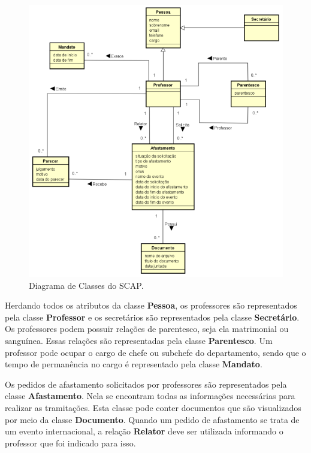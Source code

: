 \begin{figure}[h]
	\centering
	\includegraphics[scale=0.7]{figuras/fig-requisitos-diagrama-classes} 
	\caption{Diagrama de Classes do SCAP.}
	\label{fig-requisitos-diagrama-classes}
\end{figure}

Herdando todos os atributos da classe \textbf{Pessoa}, os professores são representados pela classe \textbf{Professor} e os secretários são representados pela classe \textbf{Secretário}. Os professores podem possuir relações de parentesco, seja ela matrimonial ou sanguínea. Essas relações são representadas pela classe \textbf{Parentesco}. Um professor pode ocupar o cargo de chefe ou subchefe do departamento, sendo que o tempo de permanência no cargo é representado pela classe \textbf{Mandato}.

Os pedidos de afastamento solicitados por professores são representados pela classe \textbf{Afastamento}. Nela se encontram todas as informações necessárias para realizar as tramitações. Esta classe pode conter documentos que são visualizados por meio da classe \textbf{Documento}. Quando um pedido de afastamento se trata de um evento internacional, a relação \textbf{Relator} deve ser utilizada informando o professor que foi indicado para isso.

